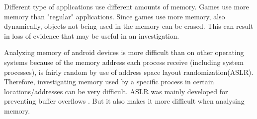 Different type of applications use different amounts of memory. Games use more memory than "regular" applications.
Since games use more memory, also dynamically, objects not being used in the memory can be erased. This can result in
loss of evidence that may be useful in an investigation.

Analyzing memory of android devices is more difficult than on other operating systems because of the memory address 
each process receive (including system processes), is fairly random by use of address space layout randomization(ASLR). 
Therefore, investigating memory used by a specific process in certain locations/addresses can be very difficult.
ASLR was mainly developed for preventing buffer overflows \cite{prot_aslr}. But it also makes it more difficult when 
analysing memory.





%
%

